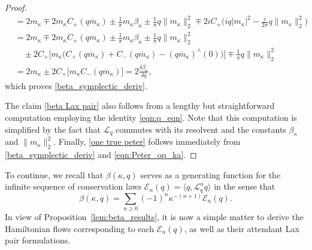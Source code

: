\documentclass{amsart}
\numberwithin{equation}{section}
\theoremstyle{definition}
\newcommand{\dl}{\delta}
\newcommand{\ka}{\kappa}
\newcommand{\Lc}{\mathcal{L}}
\newcommand{\lan}{\langle}
\newcommand{\ran}{\rangle}
\begin{document}
\begin{proof}
\begin{align*}
&=2m_\ka\mp 2m_\ka C_+(q\overline m_\ka)\pm \tfrac{1}{\pi} m_\ka\beta_\ka\pm \tfrac{1}{\pi}q\|m_\ka\|_2^2\mp2i C_+\bigl(iq|m_\ka|^2-\tfrac{i}{2\pi}q\|m_\ka\|^2_2\bigr)\\
&=2m_\ka\mp 2m_\ka C_+(q\overline m_\ka)\pm \tfrac{1}{\pi} m_\ka\beta_\ka\pm \tfrac{1}{\pi}q\|m_\ka\|^2_2 \\
&\quad \pm 2 C_+\bigl[m_\ka\bigl( C_+(q\overline m_\ka)+C_-(q\overline m_\ka)-(q\overline m_\ka)^{\wedge}(0)\bigr)\bigr] \mp \tfrac{1}{\pi}q\|m_\ka\|^2_2\\
&=2m_\ka\pm 2 C_+\bigl[m_\ka C_-(q\overline m_\ka)\bigr]=2 \tfrac{\dl \beta_\ka}{\dl \bar{q}},
\end{align*}
which proves \eqref{beta_symplectic_deriv}.

The claim \eqref{beta Lax pair} also follows from a lengthy but straightforward computation employing the identity \eqref{eqn:q_eqn}.  Note that this computation is simplified by the fact that $\Lc_q$ commutes with its resolvent and the constants $\beta_\kappa$ and $\|m_\ka\|^2_2$.  Finally, \eqref{one true peter} follows immediately from \eqref{beta_symplectic_deriv} and \eqref{eqn:Peter_op_ka}.
\end{proof}

To continue, we recall that $\beta(\ka,q)$ serves as a generating function for the infinite sequence of conservation laws $\mathcal{E}_n(q)=\lan q,\Lc_q^n q\ran$ in the sense that
$$
\beta(\ka,q)=\sum_{n\geq0}(-1)^n\ka^{-(n+1)}\mathcal{E}_n(q).
$$
In view of Proposition~\ref{lem:beta_results}, it is now a simple matter to derive the Hamiltonian flows corresponding to each $\mathcal{E}_n(q)$, as well as their attendant Lax pair formulations.
\end{document}
